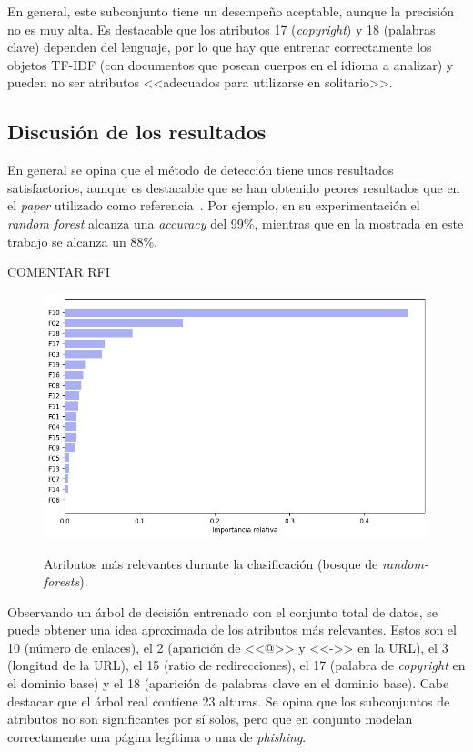 En general, este subconjunto tiene un desempeño aceptable, aunque la precisión no es muy alta. Es destacable que los atributos 17 (\textit{copyright}) y 18 (palabras clave) dependen del lenguaje, por lo que hay que entrenar correctamente los objetos TF-IDF (con documentos que posean cuerpos en el idioma a analizar) y pueden no ser atributos <<adecuados para utilizarse en solitario>>.


\subsection{Discusión de los resultados}

En general se opina que el método de detección tiene unos resultados satisfactorios, aunque es destacable que se han obtenido peores resultados que en el \textit{paper} utilizado como referencia~\cite{featuresPhishing2018Gupta}. Por ejemplo, en su experimentación el \textit{random forest} alcanza una \textit{accuracy} del 99\%, mientras que en la mostrada en este trabajo se alcanza un 88\%.

COMENTAR RFI
\begin{figure}[h]
	\caption[\textit{Phishing}: detección (\texttt{f1-f19}, atributos relevantes RFI)]{Atributos más relevantes durante la clasificación (bosque de \textit{random-forests}).}
	\centering
	\includegraphics[width=\textwidth]{../img/memoria/5_phishing/f1f19_rfi}
	\label{gr:ph-f1f19_rfi}
\end{figure}

Observando un árbol de decisión entrenado con el conjunto total de datos, se puede obtener una idea aproximada de los atributos más relevantes. Estos son el 10 (número de enlaces), el 2 (aparición de <<@>> y <<->> en la URL), el 3 (longitud de la URL), el 15 (ratio de redirecciones), el 17 (palabra de \textit{copyright} en el dominio base) y el 18 (aparición de palabras clave en el dominio base). Cabe destacar que el árbol real contiene 23 alturas. Se opina que los subconjuntos de atributos no son significantes por sí solos, pero que en conjunto modelan correctamente una página legítima o una de \textit{phishing}.

